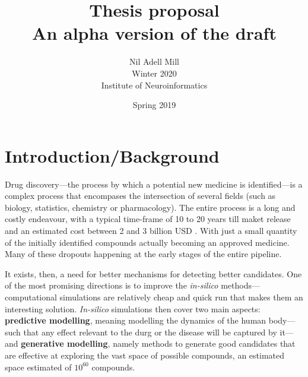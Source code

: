\documentclass{article}
\begin{document}
\title{\Large Thesis proposal \\ \small An alpha version of the draft}
\author{Nil Adell Mill \\
        Winter 2020 \\
        Institute of Neuroinformatics \\}
\date{Spring 2019}

\maketitle

    \section*{Introduction/Background}  

Drug discovery—the process by which a potential new medicine is identified---is a
 complex process that encompases the intersection of several fields (such as biology,
 statistics, chemistry or pharmacology). The entire process is a long and costly
 endeavour, with a typical time-frame of 10 to 20 years till maket release and an
 estimated cost between 2 and 3 billion USD \cite{Schneider2019, Scannell2012}. With
 just a small quantity of the initially identified compounds actually becoming an
 approved medicine. Many of these dropouts happening at the early stages of the entire
 pipeline.

It exists, then, a need for better mechanisms for detecting better candidates. One of
 the most promising directions is to improve the \emph{in-silico}
 methods---computational simulations are relatively cheap and quick run that makes them
 an interesting solution. \emph{In-silico} simulations then cover two main aspects:
 \textbf{predictive modelling}, meaning modelling the dynamics of the human body---such
 that any effect relevant to the durg or the disease will be captured by it---and
 \textbf{generative modelling}, namely methods to generate good candidates that are
 effective at exploring the vast space of possible compounds, an estimated space
 estimated of $10^{60}$ compounds\cite{Reymond2012}.



\end{document}
